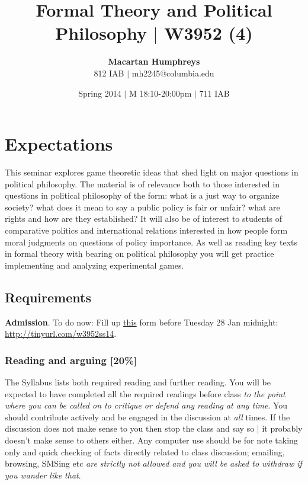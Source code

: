 \documentclass[11pt]{article}
\title{Formal Theory and Political Philosophy $|$ W3952 (4)}
\author{{\bf Macartan Humphreys} \\ 812 IAB $|$ mh2245@columbia.edu}
\date{Spring 2014 $|$  M 18:10-20:00pm $|$ 711 IAB}
\begin{document}
\singlespacing
\maketitle

\tableofcontents

\vspace{10mm}

\thispagestyle{empty}






\newpage
\section*{Expectations}
This seminar explores game theoretic ideas that shed light on major questions in political philosophy. The material is of relevance both to those interested in questions in political philosophy of the form: what is a just way to organize society? what does it mean to say a public policy is fair or unfair? what are rights and how are they established? It will also be of interest to students of comparative politics and international relations interested in how people form moral judgments on questions of policy importance. As well as reading key texts in formal theory with bearing on political philosophy you will get practice implementing and analyzing experimental games.	

\subsection*{Requirements}
\textbf{Admission}. To do now:  Fill up \href{https://docs.google.com/forms/d/1yBF8tjPJnl7-9syEklFMaOt05fUVI-38zevPY01mv9Y/viewform}{this} form before Tuesday 28 Jan midnight: \\
\url{http://tinyurl.com/w3952ss14}.  

\subsubsection*{Reading and arguing [20\%]}
The Syllabus lists both required reading and further reading. You will be expected to have completed all the required readings before class \textit{to the point where you can be called on to critique or defend any reading at any time}. You should contribute actively and be engaged in the discussion at \textit{all} times. If the discussion does not make sense to you then stop the class and say so | it probably doesn't make sense to others either. Any computer use should be for note taking only and quick checking of facts directly related to class discussion; emailing, browsing, SMSing etc \textit{are strictly not allowed and you will be asked to withdraw if you wander like that}. 
\end{document}
